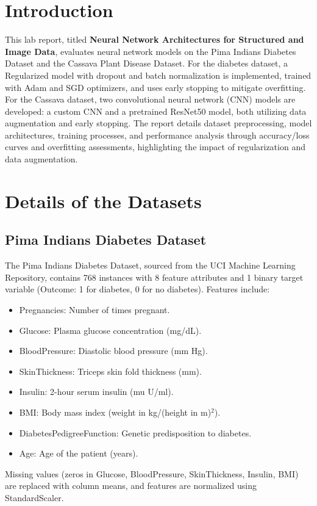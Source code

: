 \documentclass[a4paper,12pt]{article}
\begin{document}
\section*{Introduction}
This lab report, titled \textbf{Neural Network Architectures for Structured and Image Data}, evaluates neural network models on the Pima Indians Diabetes Dataset and the Cassava Plant Disease Dataset. For the diabetes dataset, a Regularized model with dropout and batch normalization is implemented, trained with Adam and SGD optimizers, and uses early stopping to mitigate overfitting. For the Cassava dataset, two convolutional neural network (CNN) models are developed: a custom CNN and a pretrained ResNet50 model, both utilizing data augmentation and early stopping. The report details dataset preprocessing, model architectures, training processes, and performance analysis through accuracy/loss curves and overfitting assessments, highlighting the impact of regularization and data augmentation.

\section*{Details of the Datasets}

\subsection*{Pima Indians Diabetes Dataset}
The Pima Indians Diabetes Dataset, sourced from the UCI Machine Learning Repository, contains 768 instances with 8 feature attributes and 1 binary target variable (Outcome: 1 for diabetes, 0 for no diabetes). Features include:
\begin{itemize}
    \item Pregnancies: Number of times pregnant.
    \item Glucose: Plasma glucose concentration (mg/dL).
    \item BloodPressure: Diastolic blood pressure (mm Hg).
    \item SkinThickness: Triceps skin fold thickness (mm).
    \item Insulin: 2-hour serum insulin (mu U/ml).
    \item BMI: Body mass index (weight in kg/(height in m)$^2$).
    \item DiabetesPedigreeFunction: Genetic predisposition to diabetes.
    \item Age: Age of the patient (years).
\end{itemize}
Missing values (zeros in Glucose, BloodPressure, SkinThickness, Insulin, BMI) are replaced with column means, and features are normalized using StandardScaler.
\end{document}
